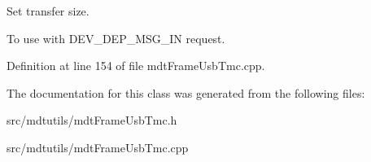 Set transfer size. 

To use with DEV\_\-DEP\_\-MSG\_\-IN request. 

Definition at line 154 of file mdtFrameUsbTmc.cpp.



The documentation for this class was generated from the following files:\begin{DoxyCompactItemize}
\item 
src/mdtutils/mdtFrameUsbTmc.h\item 
src/mdtutils/mdtFrameUsbTmc.cpp\end{DoxyCompactItemize}
